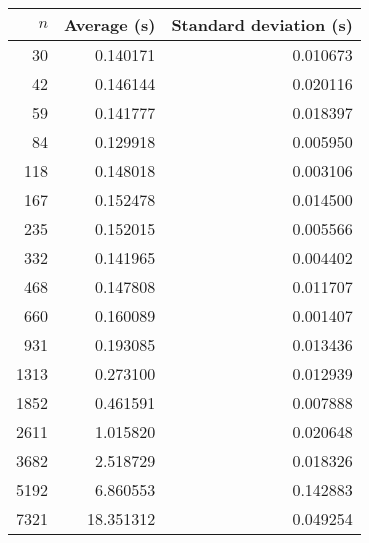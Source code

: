 \begin{tabular}{rrr}
$n$ & Average (s) & Standard deviation (s) \\\hline
30 & 0.140171 & 0.010673\\ 
42 & 0.146144 & 0.020116\\ 
59 & 0.141777 & 0.018397\\ 
84 & 0.129918 & 0.005950\\ 
118 & 0.148018 & 0.003106\\ 
167 & 0.152478 & 0.014500\\ 
235 & 0.152015 & 0.005566\\ 
332 & 0.141965 & 0.004402\\ 
468 & 0.147808 & 0.011707\\ 
660 & 0.160089 & 0.001407\\ 
931 & 0.193085 & 0.013436\\ 
1313 & 0.273100 & 0.012939\\ 
1852 & 0.461591 & 0.007888\\ 
2611 & 1.015820 & 0.020648\\ 
3682 & 2.518729 & 0.018326\\ 
5192 & 6.860553 & 0.142883\\ 
7321 & 18.351312 & 0.049254\\ 
\end{tabular}
